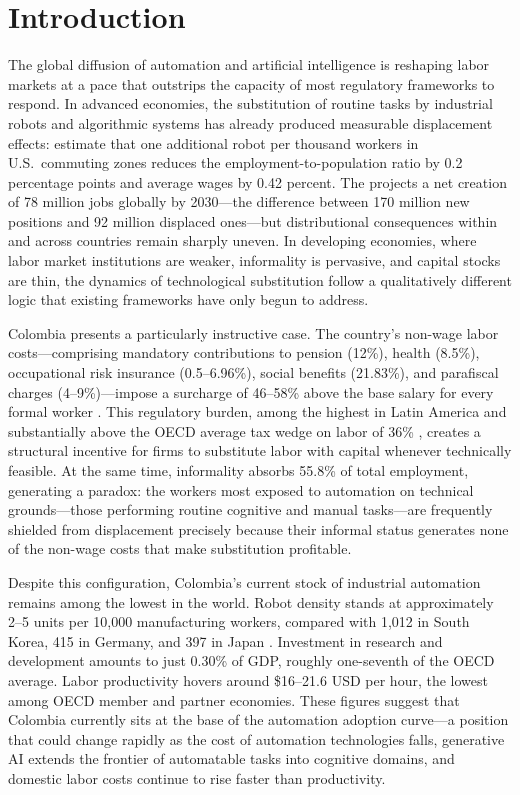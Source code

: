 \section{Introduction}
\label{sec:introduction}

The global diffusion of automation and artificial intelligence is reshaping labor markets at a pace that outstrips the capacity of most regulatory frameworks to respond. In advanced economies, the substitution of routine tasks by industrial robots and algorithmic systems has already produced measurable displacement effects: \cite{acemoglu2020robots} estimate that one additional robot per thousand workers in U.S.\ commuting zones reduces the employment-to-population ratio by 0.2 percentage points and average wages by 0.42 percent. The \cite{wef2025} projects a net creation of 78 million jobs globally by 2030---the difference between 170 million new positions and 92 million displaced ones---but distributional consequences within and across countries remain sharply uneven. In developing economies, where labor market institutions are weaker, informality is pervasive, and capital stocks are thin, the dynamics of technological substitution follow a qualitatively different logic that existing frameworks have only begun to address.

Colombia presents a particularly instructive case. The country's non-wage labor costs---comprising mandatory contributions to pension (12\%), health (8.5\%), occupational risk insurance (0.5--6.96\%), social benefits (21.83\%), and parafiscal charges (4--9\%)---impose a surcharge of 46--58\% above the base salary for every formal worker \cite{anif2018}. This regulatory burden, among the highest in Latin America and substantially above the OECD average tax wedge on labor of 36\% \cite{oecd2025voces}, creates a structural incentive for firms to substitute labor with capital whenever technically feasible. At the same time, informality absorbs 55.8\% of total employment, generating a paradox: the workers most exposed to automation on technical grounds---those performing routine cognitive and manual tasks---are frequently shielded from displacement precisely because their informal status generates none of the non-wage costs that make substitution profitable.

Despite this configuration, Colombia's current stock of industrial automation remains among the lowest in the world. Robot density stands at approximately 2--5 units per 10,000 manufacturing workers, compared with 1,012 in South Korea, 415 in Germany, and 397 in Japan \cite{ifr2024}. Investment in research and development amounts to just 0.30\% of GDP, roughly one-seventh of the OECD average. Labor productivity hovers around \$16--21.6 USD per hour, the lowest among OECD member and partner economies. These figures suggest that Colombia currently sits at the base of the automation adoption curve---a position that could change rapidly as the cost of automation technologies falls, generative AI extends the frontier of automatable tasks into cognitive domains, and domestic labor costs continue to rise faster than productivity.


